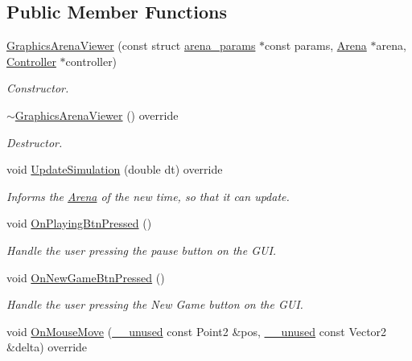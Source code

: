 \subsection*{Public Member Functions}
\begin{DoxyCompactItemize}
\item 
\mbox{\hyperlink{class_graphics_arena_viewer_a869510833897508300da65b1eb0c5d09}{Graphics\+Arena\+Viewer}} (const struct \mbox{\hyperlink{structarena__params}{arena\+\_\+params}} $\ast$const params, \mbox{\hyperlink{class_arena}{Arena}} $\ast$arena, \mbox{\hyperlink{class_controller}{Controller}} $\ast$controller)
\begin{DoxyCompactList}\small\item\em Constructor. \end{DoxyCompactList}\item 
\mbox{\hyperlink{class_graphics_arena_viewer_a88cea02aab1550a7f315fbf4f3868109}{$\sim$\+Graphics\+Arena\+Viewer}} () override
\begin{DoxyCompactList}\small\item\em Destructor. \end{DoxyCompactList}\item 
void \mbox{\hyperlink{class_graphics_arena_viewer_aeec66666382aa0312574d70aa58de250}{Update\+Simulation}} (double dt) override
\begin{DoxyCompactList}\small\item\em Informs the \mbox{\hyperlink{class_arena}{Arena}} of the new time, so that it can update. \end{DoxyCompactList}\item 
void \mbox{\hyperlink{class_graphics_arena_viewer_a7cc65fd0e2e8c1f6138608e398c7c887}{On\+Playing\+Btn\+Pressed}} ()
\begin{DoxyCompactList}\small\item\em Handle the user pressing the pause button on the G\+UI. \end{DoxyCompactList}\item 
void \mbox{\hyperlink{class_graphics_arena_viewer_a7a573f7f55d54fd066d3d47df7a6454b}{On\+New\+Game\+Btn\+Pressed}} ()
\begin{DoxyCompactList}\small\item\em Handle the user pressing the New Game button on the G\+UI. \end{DoxyCompactList}\item 
void \mbox{\hyperlink{class_graphics_arena_viewer_a74b5c524369a62ba419c89677c646d9e}{On\+Mouse\+Move}} (\mbox{\hyperlink{common_8h_a2e3484535ee610c8e19e9859563abe48}{\+\_\+\+\_\+unused}} const Point2 \&pos, \mbox{\hyperlink{common_8h_a2e3484535ee610c8e19e9859563abe48}{\+\_\+\+\_\+unused}} const Vector2 \&delta) override

\end{DoxyCompactItemize}
